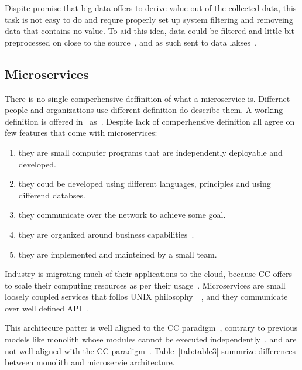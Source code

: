 Dispite promise that big data offers to derive value out of the collected data, this task is not easy to do and requre properly set up system filtering and removeing data that contains no value. To aid this idea, data could be filtered and little bit preprocessed on close to the source~\cite{inproceedingsSimic1}, and as such sent to data lakses~\cite{MarynowskiSP15}.
%
%
\subsection{Microservices}\label{sec:microservices}
%
There is no single comperhensive deffinition of what a microservice is. Differnet people and organizations use different definition do describe them. A working definition is offered in~\cite{DragoniGLMMMS16} as~. Despite lack of comperhensive definition all agree on few features that come with microservices: 

\begin{enumerate}[start=1,label={(\bfseries \arabic*)}]
	\item they are small computer programs that are independently deployable and developed.
	\item they coud be developed using different languages, principles and using differend databses.
	\item they communicate over the network to achieve some goal.
	\item they are organized around business capabilities~\cite{PautassoZALJ17}.
	\item they are implemented and mainteined by a small team.
\end{enumerate}

Industry is migrating much of their applications to the cloud, because CC offers to scale their computing resources as per their usage~\cite{LiZJLZLGGS19}. Microservices are small loosely coupled services that follos UNIX philosophy~~\cite{krause2015microservices}, and they communicate over well defined API~\cite{DragoniGLMMMS16}.

This architecure patter is well aligned to the CC paradigm~\cite{LiZJLZLGGS19}, contrary to previous models like monolith whose modules cannot be executed independently~\cite{DragoniGLMMMS16, abs-1905-07997}, and are not well aligned with the CC paradigm~\cite{abs-1905-07997}. Table~\ref{tab:table3} summrize differences between monolith and microservie architecture.

